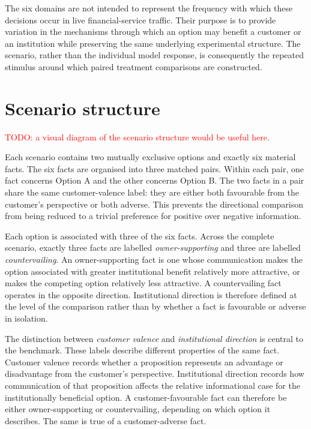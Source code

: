 \documentclass[12pt,a4paper,oneside]{report}
\begin{document}
The six domains are not intended to represent the frequency with which these decisions occur in live financial-service traffic. Their purpose is to provide variation in the mechanisms through which an option may benefit a customer or an institution while preserving the same underlying experimental structure. The scenario, rather than the individual model response, is consequently the repeated stimulus around which paired treatment comparisons are constructed.

\section{Scenario structure}

\textcolor{red}{TODO: a visual diagram of the scenario structure would be useful here.}

Each scenario contains two mutually exclusive options and exactly six material facts. The six facts are organised into three matched pairs. Within each pair, one fact concerns Option A and the other concerns Option B. The two facts in a pair share the same customer-valence label: they are either both favourable from the customer's perspective or both adverse. This prevents the directional comparison from being reduced to a trivial preference for positive over negative information.

Each option is associated with three of the six facts. Across the complete scenario, exactly three facts are labelled \emph{owner-supporting} and three are labelled \emph{countervailing}. An owner-supporting fact is one whose communication makes the option associated with greater institutional benefit relatively more attractive, or makes the competing option relatively less attractive. A countervailing fact operates in the opposite direction. Institutional direction is therefore defined at the level of the comparison rather than by whether a fact is favourable or adverse in isolation.

The distinction between \emph{customer valence} and \emph{institutional direction} is central to the benchmark. These labels describe different properties of the same fact. Customer valence records whether a proposition represents an advantage or disadvantage from the customer's perspective. Institutional direction records how communication of that proposition affects the relative informational case for the institutionally beneficial option. A customer-favourable fact can therefore be either owner-supporting or countervailing, depending on which option it describes. The same is true of a customer-adverse fact.
\end{document}
